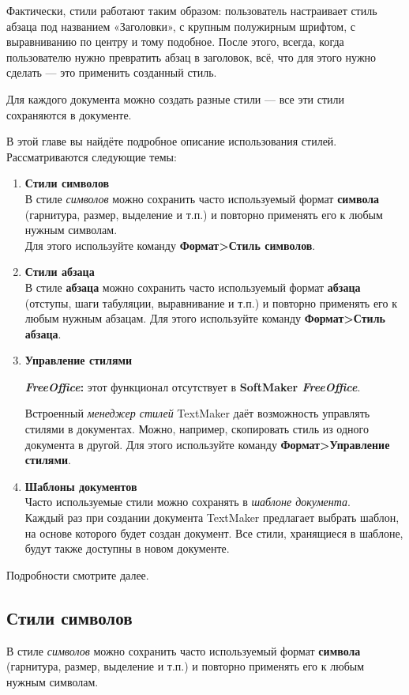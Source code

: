 ﻿\documentclass[a4paper,10pt]{article}
\begin{document}
Фактически, стили работают таким образом: пользователь настраивает стиль абзаца под названием «Заголовки», с крупным полужирным шрифтом, с выравниванию по центру и тому подобное. После этого, всегда, когда пользователю нужно превратить абзац в заголовок, всё, что для этого нужно сделать — это применить созданный стиль.

Для каждого документа можно создать разные стили — все эти стили сохраняются в документе.

В этой главе вы найдёте подробное описание использования стилей. Рассматриваются следующие темы:
\begin{enumerate}
 \item \textbf{Стили символов}\\
 В стиле \textit{символов} можно сохранить часто используемый формат \textbf{символа} (гарнитура, размер, выделение и т.п.) и повторно применять его к любым нужным символам.\\
Для этого используйте команду \textbf{Формат>Стиль символов}.
\item \textbf{Стили абзаца}\\
В стиле \textbf{абзаца} можно сохранить часто используемый формат \textbf{абзаца} (отступы, шаги табуляции, выравнивание и т.п.) и повторно применять его к любым нужным абзацам.
Для этого используйте команду \textbf{Формат>Стиль абзаца}.
\item \textbf{Управление стилями}\\
\begin{mdframed}[backgroundcolor=pink!50]
\textbf{\textit{FreeOffice}:} этот функционал отсутствует в \textbf{SoftMaker \textit{FreeOffice}}.
\end{mdframed}
Встроенный \textit{менеджер стилей} TextMaker даёт возможность управлять стилями в документах. Можно, например, скопировать стиль из одного документа в другой.
Для этого используйте команду \textbf{Формат>Управление стилями}.
\item \textbf{Шаблоны документов}\\
Часто используемые стили можно сохранять в \textit{шаблоне документа}.\\
Каждый раз при создании документа TextMaker предлагает выбрать шаблон, на основе которого будет создан документ. Все стили, хранящиеся в шаблоне, будут также доступны в новом документе.
\end{enumerate}

Подробности смотрите далее.

\subsection{Стили символов} \label{sec:стилисимволов}
В стиле \textit{символов} можно сохранить часто используемый формат \textbf{символа} (гарнитура, размер, выделение и т.п.) и повторно применять его к любым нужным символам.
\end{document}
